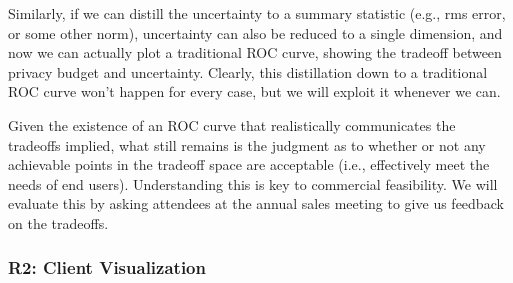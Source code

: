 Similarly, if we can distill the uncertainty to a summary statistic
(e.g., rms error, or some other norm), uncertainty can also be reduced
to a single dimension, and now we can actually plot a traditional ROC
curve, showing the tradeoff between privacy budget and uncertainty.
Clearly, this distillation down to a traditional ROC curve won't happen
for every case, but we will exploit it whenever we can.

Given the existence of an ROC curve that realistically communicates the
tradeoffs implied, what still remains is the judgment as to whether or
not any achievable points in the tradeoff space are acceptable (i.e.,
effectively meet the needs of end users).  Understanding
this is key to commercial
feasibility. We will evaluate this by
asking attendees at the annual sales meeting to give us feedback on 
the tradeoffs.

\subsubsection{R2: Client Visualization}

